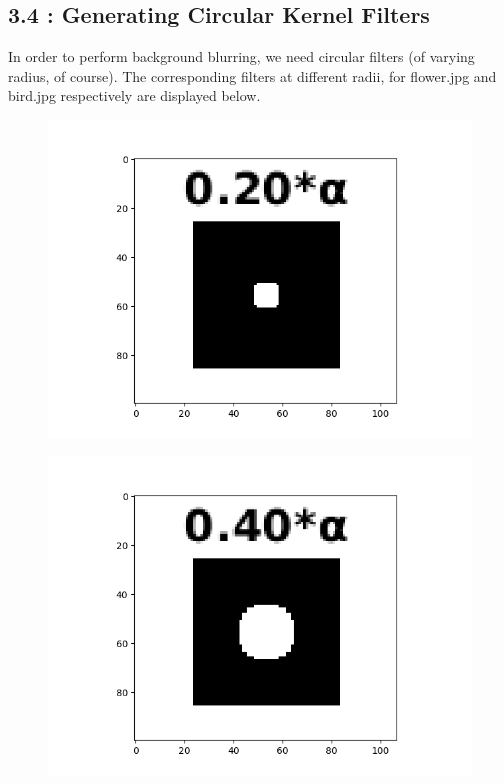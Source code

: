 \documentclass[12pt, a4paper]{article}
\begin{document}
\subsection*{3.4 : Generating Circular Kernel Filters}
In order to perform background blurring, we need circular filters (of varying radius, of course). The corresponding filters at different radii, for flower.jpg and bird.jpg respectively are displayed below.
\begin{figure}[h!]
    \centering
    \begin{minipage}[c][1\width]{0.19\textwidth}
	    \hspace*{-14pt}
    	\includegraphics[width=1.24\textwidth]{flower_kernel_0.20_cropped.png}
	    \label{fig:3.4(a)}
    \end{minipage}
    \begin{minipage}[c][1\width]{0.19\textwidth}
        \hspace*{-14pt}
    	\includegraphics[width=1.24\textwidth]{flower_kernel_0.40_cropped.png}

\end{minipage}
\end{figure}
\end{document}
